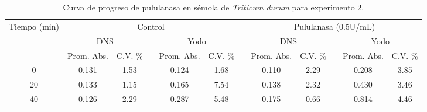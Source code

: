 \documentclass{article}
\begin{document}
\begin{table}[H]
	\centering
	\caption{Curva de progreso de pululanasa en sémola de \textit{Triticum durum} para experimento 2.}
		\begin{adjustbox}{width=\textwidth}
	\begin{tabular}{cccccccccccc}
		\toprule
		\multicolumn{1}{c}{\multirow{3}[6]{*}{Tiempo (min)}} & \multicolumn{5}{c}{Control}           &       & \multicolumn{5}{c}{Pululanasa (0.5U/mL)} \\
		\cmidrule{2-6}\cmidrule{8-12}          & \multicolumn{2}{c}{DNS} &       & \multicolumn{2}{c}{Yodo} &       & \multicolumn{2}{c}{DNS} &       & \multicolumn{2}{c}{Yodo} \\
		\cmidrule{2-3}\cmidrule{8-9}\cmidrule{11-12}          & Prom. Abs. & C.V. \% &       & Prom. Abs. & C.V. \% &       & Prom. Abs. & C.V. \% &       & Prom. Abs. & C.V. \% \\
		\midrule
		0     & 0.131 & 1.53  &       & 0.124 & 1.68  &       & 0.110 & 2.29  &       & 0.208 & 3.85 \\
		20    & 0.133 & 1.15  &       & 0.165 & 7.54  &       & 0.138 & 2.32  &       & 0.430 & 3.46 \\
		40    & 0.126 & 2.29  &       & 0.287 & 5.48  &       & 0.175 & 0.66  &       & 0.814 & 4.46 \\
		\bottomrule
	\end{tabular}%
	\end{adjustbox}
	\label{tab:e2.1}%
\end{table}%
\end{document}
